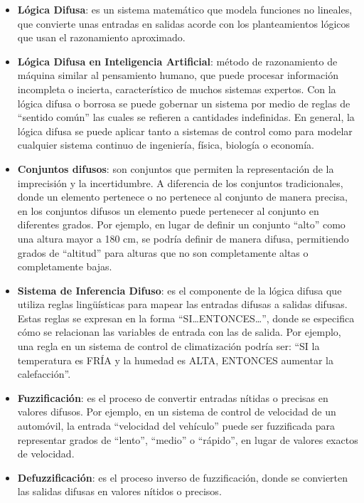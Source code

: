 \documentclass[
  a4paper,
  DIV=11,
  numbers=noendperiod]{scrreprt}
\begin{document}
\begin{itemize}
\item
  \textbf{Lógica Difusa}: es un sistema matemático que modela funciones
  no lineales, que convierte unas entradas en salidas acorde con los
  planteamientos lógicos que usan el razonamiento aproximado.
\item
  \textbf{Lógica Difusa en Inteligencia Artificial}: método de
  razonamiento de máquina similar al pensamiento humano, que puede
  procesar información incompleta o incierta, característico de muchos
  sistemas expertos. Con la lógica difusa o borrosa se puede gobernar un
  sistema por medio de reglas de ``sentido común'' las cuales se
  refieren a cantidades indefinidas. En general, la lógica difusa se
  puede aplicar tanto a sistemas de control como para modelar cualquier
  sistema continuo de ingeniería, física, biología o economía.
\item
  \textbf{Conjuntos difusos}: son conjuntos que permiten la
  representación de la imprecisión y la incertidumbre. A diferencia de
  los conjuntos tradicionales, donde un elemento pertenece o no
  pertenece al conjunto de manera precisa, en los conjuntos difusos un
  elemento puede pertenecer al conjunto en diferentes grados. Por
  ejemplo, en lugar de definir un conjunto ``alto'' como una altura
  mayor a 180 cm, se podría definir de manera difusa, permitiendo grados
  de ``altitud'' para alturas que no son completamente altas o
  completamente bajas.
\item
  \textbf{Sistema de Inferencia Difuso}: es el componente de la lógica
  difusa que utiliza reglas lingüísticas para mapear las entradas
  difusas a salidas difusas. Estas reglas se expresan en la forma
  ``SI\ldots ENTONCES\ldots{}'', donde se especifica cómo se relacionan
  las variables de entrada con las de salida. Por ejemplo, una regla en
  un sistema de control de climatización podría ser: ``SI la temperatura
  es FRÍA y la humedad es ALTA, ENTONCES aumentar la calefacción''.
\item
  \textbf{Fuzzificación}: es el proceso de convertir entradas nítidas o
  precisas en valores difusos. Por ejemplo, en un sistema de control de
  velocidad de un automóvil, la entrada ``velocidad del vehículo'' puede
  ser fuzzificada para representar grados de ``lento'', ``medio'' o
  ``rápido'', en lugar de valores exactos de velocidad.
\item
  \textbf{Defuzzificación}: es el proceso inverso de fuzzificación,
  donde se convierten las salidas difusas en valores nítidos o precisos.

\end{itemize}
\end{document}
